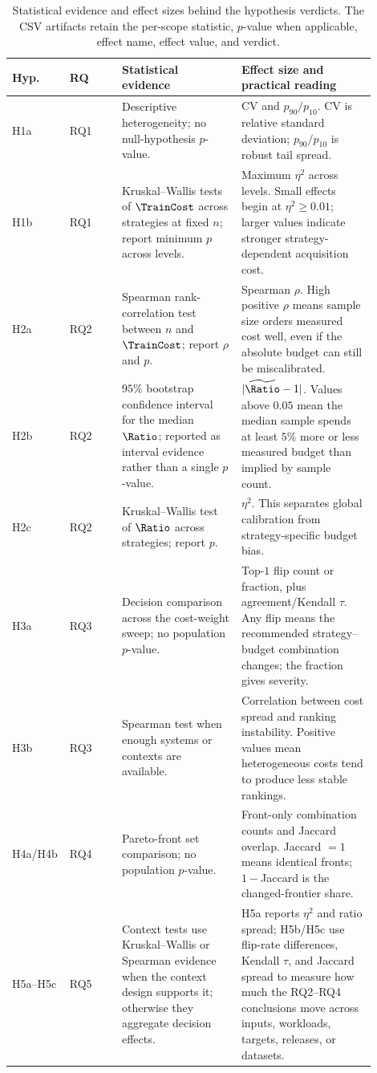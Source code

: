 \begin{table}[t]
\centering
\caption{Statistical evidence and effect sizes behind the hypothesis verdicts.
The CSV artifacts retain the per-scope statistic, $p$-value when applicable,
effect name, effect value, and verdict.}
\label{tab:app-test-evidence}
\scriptsize
\setlength{\tabcolsep}{3pt}
\begin{tabular}{p{0.08\linewidth} p{0.14\linewidth} p{0.32\linewidth} p{0.36\linewidth}}
\toprule
Hyp. & RQ & Statistical evidence & Effect size and practical reading \\
\midrule
H1a & RQ1 & Descriptive heterogeneity; no null-hypothesis $p$-value. &
CV and $p_{90}/p_{10}$. CV is relative standard deviation; $p_{90}/p_{10}$
is robust tail spread. \\
H1b & RQ1 & Kruskal--Wallis tests of $\TrainCost$ across strategies at fixed
$n$; report minimum $p$ across levels. &
Maximum $\eta^2$ across levels. Small effects begin at $\eta^2\ge0.01$;
larger values indicate stronger strategy-dependent acquisition cost. \\
H2a & RQ2 & Spearman rank-correlation test between $n$ and $\TrainCost$;
report $\rho$ and $p$. &
Spearman $\rho$. High positive $\rho$ means sample size orders measured cost
well, even if the absolute budget can still be miscalibrated. \\
H2b & RQ2 & $95\%$ bootstrap confidence interval for the median $\Ratio$;
reported as interval evidence rather than a single $p$-value. &
$|\widetilde{\Ratio}-1|$. Values above $0.05$ mean the median sample spends at
least $5\%$ more or less measured budget than implied by sample count. \\
H2c & RQ2 & Kruskal--Wallis test of $\Ratio$ across strategies; report $p$. &
$\eta^2$. This separates global calibration from strategy-specific budget
bias. \\
H3a & RQ3 & Decision comparison across the cost-weight sweep; no population
$p$-value. &
Top-$1$ flip count or fraction, plus agreement/Kendall $\tau$. Any flip means
the recommended strategy--budget combination changes; the fraction gives severity. \\
H3b & RQ3 & Spearman test when enough systems or contexts are available. &
Correlation between cost spread and ranking instability. Positive values mean
heterogeneous costs tend to produce less stable rankings. \\
H4a/H4b & RQ4 & Pareto-front set comparison; no population $p$-value. &
Front-only combination counts and Jaccard overlap. Jaccard $=1$ means identical
fronts; $1-$Jaccard is the changed-frontier share. \\
H5a--H5c & RQ5 & Context tests use Kruskal--Wallis or Spearman evidence when
the context design supports it; otherwise they aggregate decision effects. &
H5a reports $\eta^2$ and ratio spread; H5b/H5c use flip-rate differences,
Kendall $\tau$, and Jaccard spread to measure how much the RQ2--RQ4
conclusions move across inputs, workloads, targets, releases, or datasets. \\
\bottomrule
\end{tabular}
\end{table}

